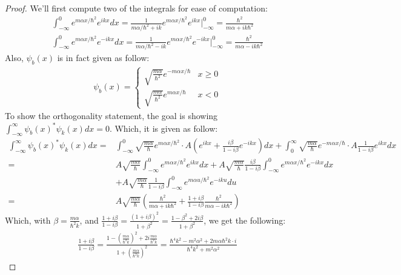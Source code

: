 \documentclass{article}
\begin{document}
\begin{proof}
    We'll first compute two of the integrals for ease of computation:
    \begin{align}
        \int_{-\infty}^{0}e^{m\alpha x/\hbar^2}e^{ikx}dx = \frac{1}{m\alpha/\hbar^2 + ik}e^{m\alpha x/\hbar^2}e^{ikx}\bigg|_{-\infty}^{0}=\frac{\hbar^2}{m\alpha+ik\hbar^2}\\
        \int_{-\infty}^{0}e^{m\alpha x/\hbar^2}e^{-ikx}dx = \frac{1}{m\alpha/\hbar^2-ik}e^{m\alpha x/\hbar^2}e^{-ikx}\bigg|_{-\infty}^{0}=\frac{\hbar^2}{m\alpha-ik\hbar^2}
    \end{align}
    Also, $\psi_b(x)$ is in fact given as follow:
    \begin{align}
        \psi_b(x)=\begin{cases}
            \sqrt{\frac{m\alpha}{\hbar^2}}e^{-m\alpha x/\hbar} & x\geq 0\\
            \sqrt{\frac{m\alpha}{\hbar^2}}e^{m\alpha x/\hbar} & x<0
        \end{cases}
    \end{align}
    To show the orthogonality statement, the goal is showing $\int_{-\infty}^{\infty}\psi_b(x)^* \psi_k(x)dx = 0$. Which, it is given as follow:
    \begin{align}
        \int_{-\infty}^{\infty}\psi_b(x)^*\psi_k(x)dx =& \int_{-\infty}^{0}\sqrt{\frac{m\alpha}{\hbar}}e^{m\alpha x/\hbar^2} \cdot A \left( e^{i k x} + \frac{i \beta}{1 - i \beta} e^{-i k x} \right)dx + \int_{0}^{\infty}\sqrt{\frac{m\alpha}{\hbar}}e^{-m\alpha x/\hbar}\cdot A \frac{1}{1 - i \beta} e^{i k x} dx\\
        =& A\sqrt{\frac{m\alpha}{\hbar}}\int_{-\infty}^{0}e^{m\alpha x/\hbar^2}e^{ikx}dx + A\sqrt{\frac{m\alpha}{\hbar}}\frac{i\beta}{1-i\beta}\int_{-\infty}^{0}e^{m\alpha x/\hbar^2}e^{-ikx}dx\\
        &+ A\sqrt{\frac{m\alpha}{\hbar}}\frac{1}{1-i\beta}\int_{-\infty}^{0}e^{m\alpha u/\hbar^2}e^{-iku}du\\
        =& A\sqrt{\frac{m\alpha}{\hbar}}\left(\frac{\hbar^2}{m\alpha+ik\hbar^2} + \frac{1+i\beta}{1-i\beta}\frac{\hbar^2}{m\alpha-ik\hbar^2}\right)
    \end{align}
    Which, with $\beta=\frac{m\alpha}{\hbar^2 k}$, and $\frac{1+i\beta}{1-i\beta}=\frac{(1+i\beta)^2}{1+\beta^2} = \frac{1-\beta^2+2i\beta}{1+\beta^2}$, we get the following:
    \begin{align}
        \frac{1+i\beta}{1-i\beta} = \frac{1-\left(\frac{m\alpha}{\hbar^2k}\right)^2 + 2i\frac{m\alpha}{\hbar^2k}}{1+\left(\frac{m\alpha}{\hbar^2k}\right)^2} = \frac{\hbar^4k^2 - m^2\alpha^2 + 2m\alpha\hbar^2k\cdot i}{\hbar^4k^2+m^2\alpha^2}

\end{align}
\end{proof}
\end{document}
